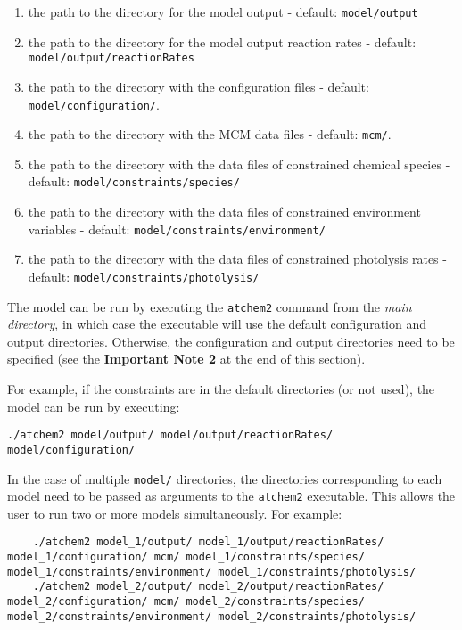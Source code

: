 \begin{enumerate}
\def\labelenumi{\arabic{enumi}.}
\item
  the path to the directory for the model output - default:
  \texttt{model/output}
\item
  the path to the directory for the model output reaction rates -
  default: \texttt{model/output/reactionRates}
\item
  the path to the directory with the configuration files - default:
  \texttt{model/configuration/}.
\item
  the path to the directory with the MCM data files - default:
  \texttt{mcm/}.
\item
  the path to the directory with the data files of constrained chemical
  species - default: \texttt{model/constraints/species/}
\item
  the path to the directory with the data files of constrained
  environment variables - default:
  \texttt{model/constraints/environment/}
\item
  the path to the directory with the data files of constrained
  photolysis rates - default: \texttt{model/constraints/photolysis/}
\end{enumerate}

The model can be run by executing the \texttt{atchem2} command from the
\emph{main directory}, in which case the executable will use the default
configuration and output directories. Otherwise, the configuration and
output directories need to be specified (see the \textbf{Important Note
2} at the end of this section).

For example, if the constraints are in the default directories (or not
used), the model can be run by executing:

\begin{verbatim}
./atchem2 model/output/ model/output/reactionRates/ model/configuration/
\end{verbatim}

In the case of multiple \texttt{model/} directories, the directories
corresponding to each model need to be passed as arguments to the
\texttt{atchem2} executable. This allows the user to run two or more
models simultaneously. For example:

\begin{verbatim}
    ./atchem2 model_1/output/ model_1/output/reactionRates/ model_1/configuration/ mcm/ model_1/constraints/species/ model_1/constraints/environment/ model_1/constraints/photolysis/
    ./atchem2 model_2/output/ model_2/output/reactionRates/ model_2/configuration/ mcm/ model_2/constraints/species/ model_2/constraints/environment/ model_2/constraints/photolysis/
\end{verbatim}

